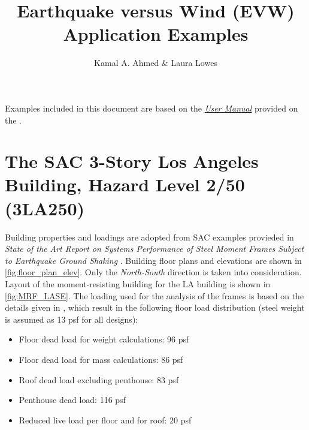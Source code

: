 \documentclass{simcenterdocumentation}
\begin{document}
\title{Earthquake versus Wind (EVW) Application Examples}

\author{Kamal A. Ahmed \& Laura Lowes}

\hypersetup{pageanchor=false}
\maketitle
\copyrightpage
\acknowledgments


\newpage

\graphicspath{{figures/}{}}

Examples included in this document are based on the \href{https://simcenter.designsafe-ci.org/media/filer_public/a0/68/a068ba45-6a47-46f4-83b1-fae585d8ccbe/evw_documentation.pdf}{\textit{User Manual}} provided on the .

\renewcommand{\thesection}{Example \arabic{section}:}
\renewcommand{\thesubsection}{Example \arabic{subsection}:}

\section{The SAC 3-Story Los Angeles Building, Hazard Level 2/50 (3LA250)}
Building properties and loadings are adopted from SAC examples provieded in \textit{State of the Art Report on Systems Performance of Steel Moment Frames Subject to Earthquake Ground Shaking} \cite{FEMA335c2000}. Building floor plans and elevations are shown in \cref{fig:floor_plan_elev}. Only the \textsl{North-South} direction is taken into consideration. Layout of the moment-resisting building for the LA building is shown in \cref{fig:MRF_LASE}.
The loading used for the analysis of the frames is based on the details given in \cite{FEMA335c2000}, which result in the following floor load distribution (steel weight is assumed as 13 psf for all designs):

\begin{itemize}
\item[] Floor dead load for weight calculations: 96 psf
\item[] Floor dead load for mass calculations:  86 psf
\item[] Roof dead load excluding penthouse:  83 psf
\item[] Penthouse dead load:  116 psf
\item[] Reduced live load per floor and for roof: 20 psf
\end{itemize}
\end{document}
